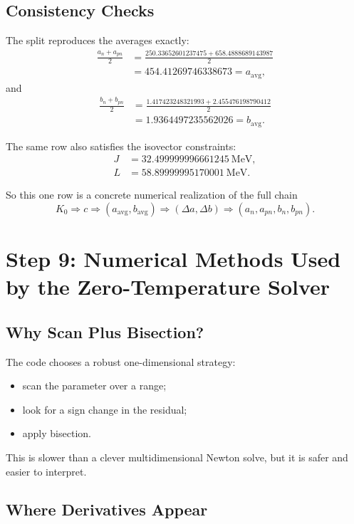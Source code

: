 \documentclass[11pt]{article}
\begin{document}
\subsection{Consistency Checks}

The split reproduces the averages exactly:
\begin{align}
\frac{a_n+a_{pn}}{2}
&=
\frac{250.33652601237475+658.4888689143987}{2} \\
&=
454.41269746338673
=
a_{\mathrm{avg}},
\end{align}
and
\begin{align}
\frac{b_n+b_{pn}}{2}
&=
\frac{1.417423248321993+2.455476198790412}{2} \\
&=
1.9364497235562026
=
b_{\mathrm{avg}}.
\end{align}

The same row also satisfies the isovector constraints:
\begin{align}
J &= 32.499999996661245\ \mathrm{MeV}, \\
L &= 58.89999995170001\ \mathrm{MeV}.
\end{align}

So this one row is a concrete numerical realization of the full chain
\[
K_0 \Longrightarrow c \Longrightarrow
(a_{\mathrm{avg}},b_{\mathrm{avg}})
\Longrightarrow
(\Delta a,\Delta b)
\Longrightarrow
(a_n,a_{pn},b_n,b_{pn}).
\]

\section{Step 9: Numerical Methods Used by the Zero-Temperature Solver}

\subsection{Why Scan Plus Bisection?}

The code chooses a robust one-dimensional strategy:
\begin{itemize}
\item scan the parameter over a range;
\item look for a sign change in the residual;
\item apply bisection.
\end{itemize}

This is slower than a clever multidimensional Newton solve, but it is safer and
easier to interpret.

\subsection{Where Derivatives Appear}
\end{document}
